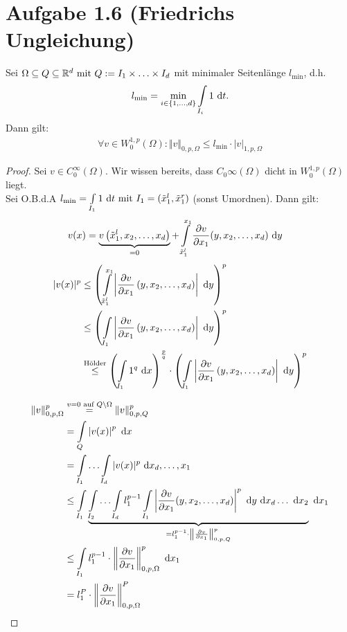 \documentclass[12pt,a4paper]{article}
\begin{document}
\section*{Aufgabe 1.6 (Friedrichs Ungleichung)}
Sei $\Omega\subseteq Q\subseteq\mathbb{R}^d\text{ mit } Q:=I_1\times\ldots\times I_d$ mit minimaler Seitenlänge $l_{\min}$, d.h.
\begin{align*}
l_{\min}=\min\limits_{i\in\lbrace1,\ldots,d\rbrace}\int\limits_{I_i} 1\text{ d} t.
\end{align*}
Dann gilt:
\begin{align*}
\forall v\in W_0^{1,p}(\Omega):\Vert v\Vert_{0,p,\Omega}\leq l_{\min}\cdot|v|_{1,p,\Omega}
\end{align*}
\begin{proof}
Sei $v\in C_0^\infty(\Omega)$. Wir wissen bereits, dass $C_0\infty(\Omega)$ dicht in $W_0^{1,p}(\Omega)$ liegt.\\
Sei O.B.d.A $l_{\min}=\int\limits_{I_1}1\text{ d} t\text{ mit } I_1=(\tilde{x}_1^l,\tilde{x}_1^r)$ (sonst Umordnen). Dann gilt:
\begin{align*}
v(x)&=\underbrace{v\left(\tilde{x}_1^l, x_2,\ldots,x_d\right)}_{=0}+
\int\limits_{\tilde{x}_1^l}^{x_1}\frac{\partial v}{\partial x_1}(y,x_2,\ldots,x_d)\text{ d} y
\end{align*}
\begin{align*}
|v(x)|^p&\leq\left(\int\limits_{\tilde{x}_1^l}^{x_1}\left|\frac{\partial v}{\partial x_1}\left(y,x_2,\ldots,x_d\right)\right|\text{ d} y\right)^p\\
&\leq
\left(\int\limits_{I_1}\left|\frac{\partial v}{\partial x_1}\left(y,x_2,\ldots,x_d\right)\right|\text{ d} y\right)^p\\
&\stackrel{\text{Hölder}}{\leq}
\left(\int\limits_{I_1} 1^q\text{ d} x\right)^{\frac{p}{q}}\cdot\left(\int\limits_{I_1}\left|\frac{\partial v}{\partial x_1}\left(y,x_2,\ldots,x_d\right)\right|\text{ d} y\right)^p
\end{align*}

\begin{align*}
\Vert v\Vert_{0,p,\Omega}^p
&\stackrel{v=0\text{ auf }Q\setminus\Omega}{=}
\Vert v\Vert^p_{0,p,Q}\\
&=\int\limits_Q\left|v(x)\right|^p\text{ d} x\\
&=\int\limits_{I_1}\hdots\int\limits_{I_d} |v(x)|^p\text{ d} x_d,\ldots,x_1\\
&\leq
\int\limits_{I_1}\underbrace{\int\limits_{I_2}\hdots\int\limits_{I_d}l_1^{p-1}\int\limits_{I_1}\left|\frac{\partial v}{\partial x_1}(y,x_2,\ldots,x_d)\right|^p\text{ d} y\text{ d} x_d\ldots\text{ d} x_2}_{=l_1^{p-1}\cdot\left\Vert\frac{\partial v}{\partial x_1}\right\Vert^p_{0,p,Q}}\text{ d} x_1\\
&\leq \int\limits_{I_1} l_1^{p-1}\cdot\left\Vert\frac{\partial v}{\partial x_1}\right\Vert^p_{0,p,\Omega}\text{ d} x_1\\
&=l_1^P\cdot\left\Vert\frac{\partial v}{\partial x_1}\right\Vert^P_{0,p,\Omega}
\end{align*}
\end{proof}
\end{document}
